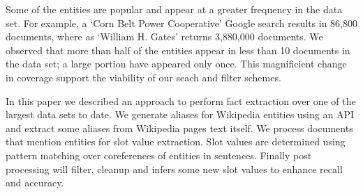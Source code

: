 
Some of the entities are popular and appear at a greater frequency in the data set.
For example, a `Corn Belt Power Cooperative' Google search results in 86,800 documents, where as `William H. Gates' returns 3,880,000 documents. 
We observed that more than half of the entities appear in less than 10 documents in the data set;
a large portion have appeared only once. This magnificient change in coverage support the viability of our seach and filter schemes.






In this paper we described an approach to perform fact extraction over one of the largest data sets to date. 
We generate aliases for Wikipedia entities using an API and extract some aliases from Wikipedia pages text itself.
We process documents that mention entities for slot value extraction.
Slot values are determined using pattern matching over coreferences of entities in sentences. Finally post processing will filter, cleanup and infers some new slot values to enhance recall and accuracy. 

